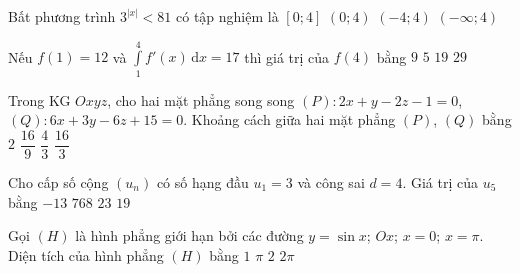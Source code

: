 \begin{ex}%
	Bất phương trình $3^{\left|x\right|}<81$ có tập nghiệm là
	\choice
	{$\left[0;4\right]$}
	{$\left(0;4\right)$}
	{\True $\left(-4;4\right)$}
	{$\left(-\infty ;4\right)$}
\end{ex}

\begin{ex}%
	Nếu $f(1)=12$ và $\displaystyle\int\limits_1^4f'(x)\mathrm{\,d}x=17$ thì giá trị của $f(4)$ bằng
	\choice
	{$ 9$}
	{$ 5$}
	{$ 19$}
	{\True $ 29$}
\end{ex}

\begin{ex}%
	Trong KG $Oxyz$, cho hai mặt phẳng song song $(P)\colon 2x+y-2z-1=0$, $(Q)\colon 6x+3y-6z+15=0$. Khoảng cách giữa hai mặt phẳng $(P)$, $(Q)$ bằng
	\choice
	{\True $2$}
	{$\dfrac{16}{9}$}
	{$\dfrac{4}{3}$}
	{$\dfrac{16}{3}$}
\end{ex}

\begin{ex}%
	Cho cấp số cộng $\left(u_n\right)$ có số hạng đầu $u_1=3$ và công sai $d=4$. Giá trị của $u_5$ bằng
	\choice
	{$-13$}
	{$768$}
	{$23$}
	{\True $19$}
\end{ex}

\begin{ex}%
	Gọi $(H)$ là hình phẳng giới hạn bởi các đường $ y=\sin x$; $Ox$; $x=0$; $x=\pi $. Diện tích của hình phẳng $(H)$ bằng
	\choice
	{$1$}
	{$\pi$}
	{\True $2$}
	{$2\pi$}
\end{ex}

